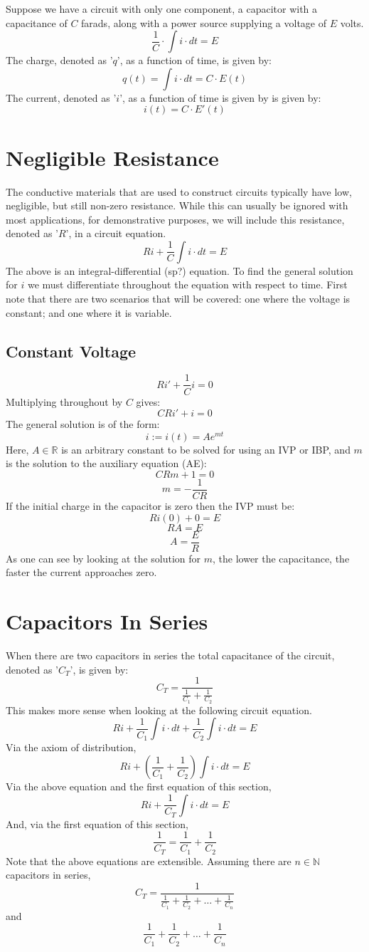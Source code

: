 \documentclass{article}
\begin{document}
	Suppose we have a circuit with only one component, a capacitor with a 
	capacitance of $C$ farads, along with a power source supplying a voltage of 
	$E$ volts.
	$$ \frac{1}{C}\cdot\int i \cdot dt = E$$
	The charge, denoted as '$q$', as a function of time, is given by:
	$$ q(t) = \int i \cdot dt = C \cdot E(t)$$
	The current, denoted as '$i$', as a function of time is given by is given 
	by:
	$$ i(t) = C \cdot E'(t)$$
	\section[Resistance]{Negligible Resistance}
	The conductive materials that are used to construct circuits typically have 
	low, negligible, but still non-zero resistance.  While this can usually be 
	ignored with most applications, for demonstrative purposes, we will include 
	this resistance, denoted as '$R$', in a circuit equation.
	$$ Ri + \frac{1}{C} \int i \cdot dt = E$$
	The above is an integral-differential (sp?) equation.  To find the general 
	solution for $i$ we must differentiate throughout the equation with respect 
	to time.  First note that there are two scenarios that will be covered: one 
	where the voltage is constant; and one where it is variable.
	\subsection[Constant V.]{Constant Voltage}
	$$ Ri' + \frac{1}{C} i = 0$$
	Multiplying throughout by $C$ gives:
	$$ CRi' + i = 0$$
	The general solution is of the form:
	$$ i:=i(t)=Ae^{mt}$$
	Here, $A \in \mathbb{R}$ is an arbitrary constant to be solved for using an 
	IVP or IBP, and $m$ is the solution to the auxiliary equation (AE):
	$$ CRm + 1 = 0$$
	$$ m = -\frac{1}{CR}$$
	If the initial charge in the capacitor is zero then the IVP must be:
	$$ Ri(0) + 0 = E $$
	$$ RA = E$$
	$$ A = \frac{E}{R}$$
	As one can see by looking at the solution for $m$, the lower the 
	capacitance, the faster the current approaches zero.
	\section[Series]{Capacitors In Series}
	When there are two capacitors in series the total capacitance of the 
	circuit, denoted as '$C_T$', is given by:
	$$ C_T = \frac{1}{\frac{1}{C_1} + \frac{1}{C_2}}$$ 
	This makes more sense when looking at the following circuit equation.
	$$ Ri + \frac{1}{C_1} \int i \cdot dt + \frac{1}{C_2} \int i \cdot dt = E$$
	Via the axiom of distribution,
	$$ Ri + \left(\frac{1}{C_1} + \frac{1}{C_2}\right)\int i \cdot dt = E$$
	Via the above equation and the first equation of this section,
	$$ Ri + \frac{1}{C_T}\int i \cdot dt = E$$
	And, via the first equation of this section,
	$$ \frac{1}{C_T} = \frac{1}{C_1} + \frac{1}{C_2}$$
	Note that the above equations are extensible.  Assuming there are $n \in 
	\mathbb{N}$ capacitors in series, 
	$$ C_T = \frac{1}{\frac{1}{C_1} + \frac{1}{C_2} + \dots + 
	\frac{1}{C_n}}$$
	and 
	$$ \frac{1}{C_1} + \frac{1}{C_2} + \dots + \frac{1}{C_n}$$
\end{document}
